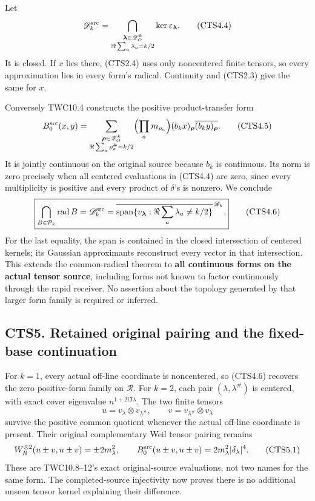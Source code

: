 Let \[
\mathscr D_k^{\rm src}=\bigcap_{\substack{\boldsymbol\lambda\in\mathscr Z_O^k\\\Re\sum_a\lambda_a=k/2}}
\ker\varepsilon_{\boldsymbol\lambda}.
\tag{CTS4.4}
\] It is closed. If \(x\) lies there, (CTS2.4) uses only noncentered
finite tensors, so every approximation lies in every form's radical.
Continuity and (CTS2.3) give the same for \(x\).

Conversely TWC10.4 constructs the positive product-transfer form \[
B_0^{\rm src}(x,y)=\sum_{\substack{\boldsymbol\rho\in\mathscr Z_O^k\\\Re\sum_a\rho_a^\#=k/2}}
\Bigl(\prod_a m_{\rho_a}\Bigr)(b_kx)_{\boldsymbol\rho}
\overline{(b_ky)_{\boldsymbol\rho}}.
\tag{CTS4.5}
\] It is jointly continuous on the original source because \(b_k\) is
continuous. Its norm is zero precisely when all centered evaluations in
(CTS4.4) are zero, since every multiplicity is positive and every
product of \(\delta\)'s is nonzero. We conclude \[
\boxed{\bigcap_{B\in\mathcal P_k}\operatorname{rad}B
=\mathscr D_k^{\rm src}
=\overline{\operatorname{span}\{v_{\boldsymbol\lambda}:\Re\sum_a\lambda_a\ne k/2\}}^{\,\mathscr R_k}.}
\tag{CTS4.6}
\] For the last equality, the span is contained in the closed
intersection of centered kernels; its Gaussian approximants reconstruct
every vector in that intersection. This extends the common-radical
theorem to \textbf{all continuous forms on the actual tensor source},
including forms not known to factor continuously through the rapid
receiver. No assertion about the topology generated by that larger form
family is required or inferred.

\subsection{CTS5. Retained original pairing and the fixed-base
continuation}\label{cts5.-retained-original-pairing-and-the-fixed-base-continuation}

For \(k=1\), every actual off-line coordinate is noncentered, so
(CTS4.6) recovers the zero positive-form family on \(\mathcal R\). For
\(k=2\), each pair \((\lambda,\lambda^\#)\) is centered, with exact
cover eigenvalue \(n^{1+2i\Im\lambda}\). The two finite tensors \[
u=v_\lambda\otimes v_{\lambda^\#},\qquad v=v_{\lambda^\#}\otimes v_\lambda
\] survive the positive common quotient whenever the actual off-line
coordinate is present. Their original complementary Weil tensor pairing
remains \[
W_R^{\otimes2}(u\pm v,u\pm v)=\pm2m_\lambda^2,
\qquad B_0^{\rm src}(u\pm v,u\pm v)=2m_\lambda^2|\delta_\lambda|^4.
\tag{CTS5.1}
\] These are TWC10.8--12's exact original-source evaluations, not two
names for the same form. The completed-source injectivity now proves
there is no additional unseen tensor kernel explaining their difference.

